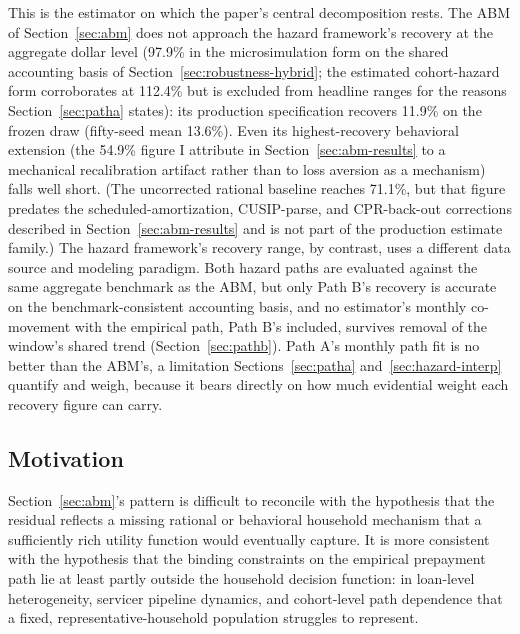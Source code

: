 \documentclass[12pt]{article}
\begin{document}
This is the estimator on which the paper's central decomposition rests. The ABM of Section~\ref{sec:abm} does not approach the hazard framework's recovery at the aggregate dollar level (97.9\% in the microsimulation form on the shared accounting basis of Section~\ref{sec:robustness-hybrid}; the estimated cohort-hazard form corroborates at 112.4\% but is excluded from headline ranges for the reasons Section~\ref{sec:patha} states): its production specification recovers 11.9\% on the frozen draw (fifty-seed mean 13.6\%). Even its highest-recovery behavioral extension (the 54.9\% figure I attribute in Section~\ref{sec:abm-results} to a mechanical recalibration artifact rather than to loss aversion as a mechanism) falls well short. (The uncorrected rational baseline reaches 71.1\%, but that figure predates the scheduled-amortization, CUSIP-parse, and CPR-back-out corrections described in Section~\ref{sec:abm-results} and is not part of the production estimate family.) The hazard framework's recovery range, by contrast, uses a different data source and modeling paradigm. Both hazard paths are evaluated against the same aggregate benchmark as the ABM, but only Path B's recovery is accurate on the benchmark-consistent accounting basis, and no estimator's monthly co-movement with the empirical path, Path B's included, survives removal of the window's shared trend (Section~\ref{sec:pathb}). Path A's monthly path fit is no better than the ABM's, a limitation Sections~\ref{sec:patha} and~\ref{sec:hazard-interp} quantify and weigh, because it bears directly on how much evidential weight each recovery figure can carry.

\subsection{Motivation}\label{sec:hazard-motivation}

Section~\ref{sec:abm}'s pattern is difficult to reconcile with the hypothesis that the residual reflects a missing rational or behavioral household mechanism that a sufficiently rich utility function would eventually capture. It is more consistent with the hypothesis that the binding constraints on the empirical prepayment path lie at least partly outside the household decision function: in loan-level heterogeneity, servicer pipeline dynamics, and cohort-level path dependence that a fixed, representative-household population struggles to represent.
\end{document}
